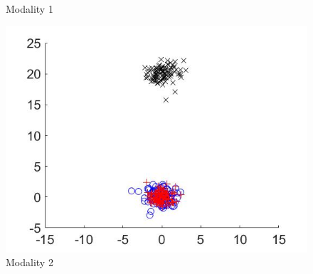 \documentclass{beamer}
\begin{document}
\begin{frame}
\begin{figure}[ht]
\begin{minipage}[b]{0.30\linewidth}
      \caption{Modality 1}
    \end{minipage}
    \begin{minipage}[b]{0.30\linewidth}
      \centering
      \includegraphics[width=\textwidth]{./Images/Synthetic/set2.jpg}
      \caption{Modality 2}
    \end{minipage}
    \label{fig:SynthData}
  \end{figure}
\end{frame}

\end{document}
